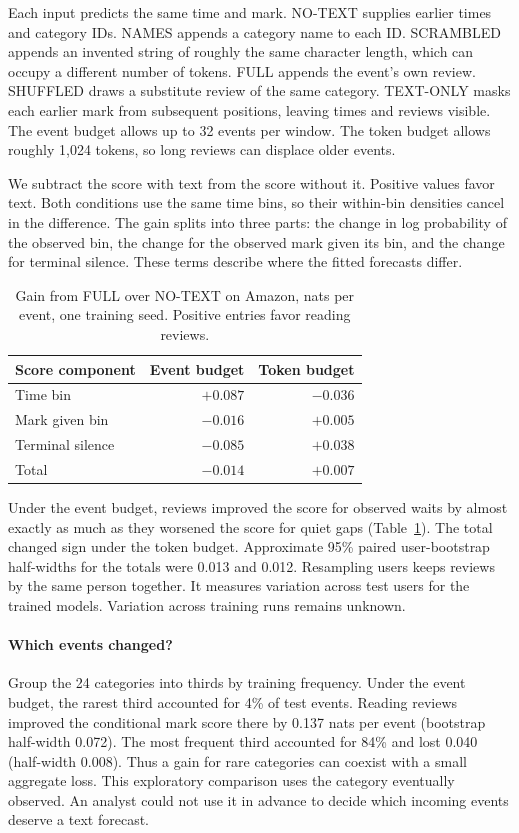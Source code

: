 \documentclass[sigconf,nonacm]{acmart}
\begin{document}
Each input predicts the same time and mark. NO-TEXT supplies earlier times and category IDs. NAMES appends a category name to each ID. SCRAMBLED appends an invented string of roughly the same character length, which can occupy a different number of tokens. FULL appends the event's own review. SHUFFLED draws a substitute review of the same category. TEXT-ONLY masks each earlier mark from subsequent positions, leaving times and reviews visible. The event budget allows up to 32 events per window. The token budget allows roughly 1,024 tokens, so long reviews can displace older events.

We subtract the score with text from the score without it. Positive values favor text. Both conditions use the same time bins, so their within-bin densities cancel in the difference. The gain splits into three parts: the change in log probability of the observed bin, the change for the observed mark given its bin, and the change for terminal silence. These terms describe where the fitted forecasts differ.
\begin{table}[ht]
\caption{Gain from FULL over NO-TEXT on Amazon, nats per event, one training seed. Positive entries favor reading reviews.}\label{tab:text}
\centering\begin{tabular}{lrr}\toprule Score component & Event budget & Token budget\\\midrule
Time bin & $+0.087$ & $-0.036$\\
Mark given bin & $-0.016$ & $+0.005$\\
Terminal silence & $-0.085$ & $+0.038$\\\midrule
Total & $-0.014$ & $+0.007$\\\bottomrule\end{tabular}
\end{table}

Under the event budget, reviews improved the score for observed waits by almost exactly as much as they worsened the score for quiet gaps (Table~\ref{tab:text}). The total changed sign under the token budget. Approximate 95\% paired user-bootstrap half-widths for the totals were 0.013 and 0.012. Resampling users keeps reviews by the same person together. It measures variation across test users for the trained models. Variation across training runs remains unknown.

\paragraph{Which events changed?}
Group the 24 categories into thirds by training frequency. Under the event budget, the rarest third accounted for 4\% of test events. Reading reviews improved the conditional mark score there by 0.137 nats per event (bootstrap half-width 0.072). The most frequent third accounted for 84\% and lost 0.040 (half-width 0.008). Thus a gain for rare categories can coexist with a small aggregate loss. This exploratory comparison uses the category eventually observed. An analyst could not use it in advance to decide which incoming events deserve a text forecast.
\end{document}
